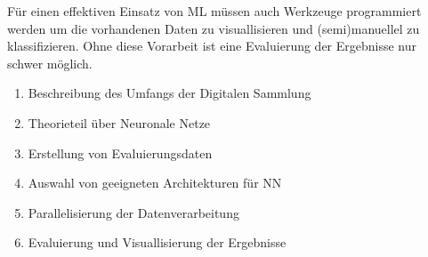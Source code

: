 \documentclass[nohyper,nobib]{tufte-handout}
\begin{document}
Für einen effektiven Einsatz von ML müssen auch Werkzeuge programmiert werden um die vorhandenen Daten zu visuallisieren 
und (semi)manuellel zu klassifizieren. 
Ohne diese Vorarbeit ist eine Evaluierung der Ergebnisse nur schwer möglich. 




\begin{enumerate}
	\item Beschreibung des Umfangs der Digitalen Sammlung
	\item Theorieteil über Neuronale Netze 
	\item Erstellung von Evaluierungsdaten
	\item Auswahl von geeigneten Architekturen für NN
	\item Parallelisierung der Datenverarbeitung
	\item Evaluierung und Visuallisierung der Ergebnisse
\end{enumerate}

% 
\printbibliography{}
\end{document}
